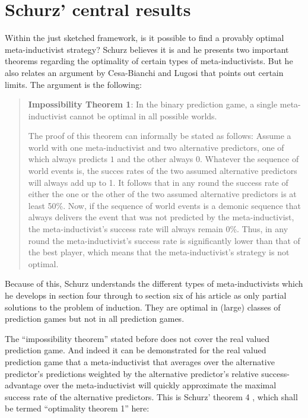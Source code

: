 \documentclass[12pt, a4paper]{article}
\numberwithin{equation}{section}
\begin{document}
\section{Schurz' central results}

Within the just sketched framework, is it possible to find a provably
optimal meta-inductivist strategy? Schurz believes it is and he presents two
important theorems regarding the optimality of certain types of
meta-inductivists. But he also relates an argument \cite[p.
298]{schurz:2008} by Cesa-Bianchi and Lugosi \cite[p.
67]{cesaBianchi-lugosi:2006} that points out certain limits. The
argument is the following:

\begin{quote}
{\bf Impossibility Theorem 1}: In the binary prediction game, a single
meta-inductivist cannot be optimal in all possible worlds.

The proof of this theorem can informally be stated as follows: Assume a
world with one meta-inductivist and two alternative predictors, one of which always
predicts $1$ and the other always $0$. Whatever the sequence of world events
is, the succes rates of the two assumed alternative predictors will always add up
to 1. It follows that in any round the success rate of either the one or the other
of the two assumed alternative predictors is at least 50\%.  Now, if the sequence
of world events is a demonic sequence that always delivers the event that was
not predicted by the meta-inductivist, the meta-inductivist's success rate will
always remain 0\%. Thus, in any round the meta-inductivist's success
rate is significantly lower than that of the best player, which means that the
meta-inductivist's strategy is not optimal.
\end{quote}

Because of this, Schurz understands the different types of
meta-inductivists which he develops in section four 
through to section six of his article \cite[p. 285-296]{schurz:2008} as
only partial solutions to the problem of induction. They are optimal in
(large) classes of prediction games but not in all prediction games.


The ``impossibility theorem'' stated before does not cover the real
valued prediction game.  And indeed it can be demonstrated for the real valued
prediction game that a meta-inductivist that averages over the
alternative predictor's predictions weighted by the alternative
predictor's relative success-advantage over the meta-inductivist will
quickly approximate the maximal success rate of the alternative
predictors. This is Schurz' theorem 4 \cite[p. 297]{schurz:2008}, which
shall be termed ``optimality theorem 1'' here:
\end{document}
